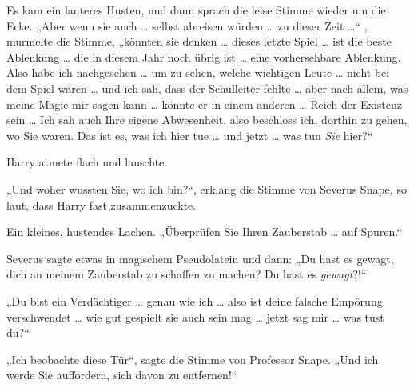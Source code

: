 Es kam ein lauteres Husten, und dann sprach die leise Stimme wieder um die Ecke.
„Aber wenn sie auch … selbst abreisen würden … zu dieser Zeit …“ , murmelte die Stimme, „könnten sie denken … dieses letzte Spiel … ist die beste Ablenkung … die in diesem Jahr noch übrig ist … eine vorhersehbare Ablenkung. Also habe ich nachgesehen … um zu sehen, welche wichtigen Leute … nicht bei dem Spiel waren … und ich sah, dass der Schulleiter fehlte … aber nach allem, was meine Magie mir sagen kann … könnte er in einem anderen … Reich der Existenz sein … Ich sah auch Ihre eigene Abwesenheit, also beschloss ich, dorthin zu gehen, wo Sie waren. Das ist es, was ich hier tue … und jetzt … was tun \emph{Sie} hier?“

Harry atmete flach und lauschte.

„Und woher wussten Sie, wo ich bin?“, erklang die Stimme von Severus Snape, so laut, dass Harry fast zusammenzuckte.

Ein kleines, hustendes Lachen.
„Überprüfen Sie Ihren Zauberstab … auf Spuren.“

Severus sagte etwas in magischem Pseudolatein und dann:
„Du hast es gewagt, dich an meinem Zauberstab zu schaffen zu machen? Du hast es \emph{gewagt}?!“

„Du bist ein Verdächtiger … genau wie ich … also ist deine falsche Empörung verschwendet … wie gut gespielt sie auch sein mag … jetzt sag mir … was tust du?“

„Ich beobachte diese Tür“, sagte die Stimme von Professor Snape.
„Und ich werde Sie auffordern, sich davon zu entfernen!“

